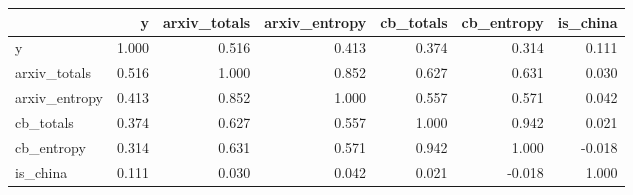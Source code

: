 \begin{tabular}{lrrrrrr}
\toprule
{} &      y &  arxiv\_totals &  arxiv\_entropy &  cb\_totals &  cb\_entropy &  is\_china \\
\midrule
y             &  1.000 &         0.516 &          0.413 &      0.374 &       0.314 &     0.111 \\
arxiv\_totals  &  0.516 &         1.000 &          0.852 &      0.627 &       0.631 &     0.030 \\
arxiv\_entropy &  0.413 &         0.852 &          1.000 &      0.557 &       0.571 &     0.042 \\
cb\_totals     &  0.374 &         0.627 &          0.557 &      1.000 &       0.942 &     0.021 \\
cb\_entropy    &  0.314 &         0.631 &          0.571 &      0.942 &       1.000 &    -0.018 \\
is\_china      &  0.111 &         0.030 &          0.042 &      0.021 &      -0.018 &     1.000 \\
\bottomrule
\end{tabular}
